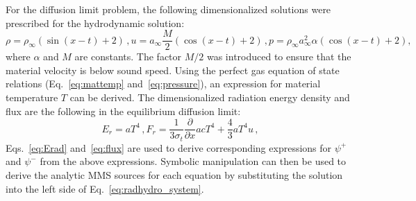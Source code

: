 \documentclass[preprint,12pt]{elsarticle}
\newcommand{\dxdy}[2]{\frac{\partial #1}{\partial #2}}
\newcommand{\pec}{\, ,}
\newcommand{\E}{{E_r}}
\newcommand{\F}{{F_r}}
\begin{document}
For the diffusion limit problem, the following dimensionalized solutions were prescribed for the hydrodynamic solution:
\begin{subequations}
   \begin{equation} 
      \rho = \rho_{\infty}\left(\sin(x - t) + 2\right) \pec
   \end{equation} 
   \begin{equation}
       u = {a_\infty}\frac{M}{2}\left(\cos(x - t) + 2\right) \pec 
   \end{equation} 
   \begin{equation} 
       p = \rho_\infty a_\infty^2 \alpha\left(\cos(x - t) + 2\right) ,
   \end{equation}
\end{subequations}
where $\alpha$ and $M$ are constants.  The factor $M/2$ was introduced to ensure
that the material velocity is below sound speed.
Using the perfect gas equation of state relations (Eq.~\eqref{eq:mattemp} and~\eqref{eq:pressure}), an expression for material temperature $T$ can be derived.
 The dimensionalized radiation energy density and flux are the following in the equilibrium diffusion limit:
\begin{subequations}
   \begin{equation} 
     \E = aT^4 \pec
   \end{equation}
   \begin{equation} 
       \F = \frac{1}{3\sigma_t}\dxdy{}{x} a c T^4 +
\frac{4}{3} a T^4u 
\pec \end{equation} 
\end{subequations}
Eqs.~\eqref{eq:Erad} and~\eqref{eq:flux} are used to derive corresponding expressions for $\psi^+$ and $\psi^-$ from the above expressions.
Symbolic manipulation can then be used to derive the analytic MMS sources for each equation by substituting the solution into the left side
of Eq.~\eqref{eq:radhydro_system}.
\end{document}
